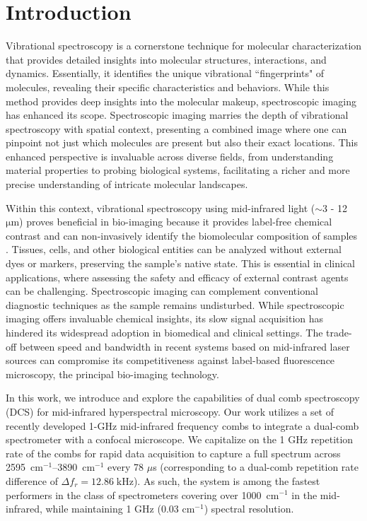 \documentclass[aip,reprint]{revtex4-1}
\begin{document}


\section{Introduction}
Vibrational spectroscopy is a cornerstone technique for molecular characterization that provides detailed insights into molecular structures, interactions, and dynamics. Essentially, it identifies the unique vibrational ``fingerprints" of molecules, revealing their specific characteristics and behaviors. While this method provides deep insights into the molecular makeup, spectroscopic imaging has enhanced its scope. Spectroscopic imaging marries the depth of vibrational spectroscopy with spatial context, presenting a combined image where one can pinpoint not just which molecules are present but also their exact locations. This enhanced perspective is invaluable across diverse fields, from understanding material properties to probing biological systems, facilitating a richer and more precise understanding of intricate molecular landscapes.

Within this context, vibrational spectroscopy using mid-infrared light ($\sim$3 - 12 $\mathrm{\mu m}$) proves beneficial in bio-imaging because it provides label-free chemical contrast and can non-invasively identify the biomolecular composition of samples \cite{bakerUsingFourierTransform2014}. Tissues, cells, and other biological entities can be analyzed without external dyes or markers, preserving the sample's native state. This is essential in clinical applications, where assessing the safety and efficacy of external contrast agents can be challenging. Spectroscopic imaging can complement conventional diagnostic techniques as the sample remains undisturbed. While spectroscopic imaging offers invaluable chemical insights, its slow signal acquisition has hindered its widespread adoption in biomedical and clinical settings. The trade-off between speed and bandwidth in recent systems \cite{zhangDepthresolvedMidinfraredPhotothermal2016,koleDiscreteFrequencyInfrared2012,yehFastInfraredChemical2015}  based on mid-infrared laser sources can compromise its competitiveness against label-based fluorescence microscopy, the principal bio-imaging technology.

In this work, we introduce and explore the capabilities of dual comb spectroscopy (DCS)\cite{coddingtonDualcombSpectroscopy2016} for mid-infrared hyperspectral microscopy.  Our work utilizes a set of recently developed 1-GHz mid-infrared frequency combs \cite{hoghooghiBroadband1GHzMidinfrared2022} to integrate a dual-comb spectrometer with a confocal microscope. We capitalize on the 1 GHz repetition rate of the combs for rapid data acquisition to capture a full spectrum across \mbox{2595 $\mathrm{cm^{-1}}$}--\mbox{3890 $\mathrm{cm^{-1}}$} every 78 $\mu$s (corresponding to a dual-comb repetition rate difference of  \mbox{$\Delta f_r=12.86 \; \text{kHz}$}). As such, the system is among the fastest performers in the class of spectrometers covering over \mbox{1000 $\mathrm{cm^{-1}}$} in the mid-infrared, while maintaining 1 GHz (0.03 cm$^{-1}$) spectral resolution.
\end{document}
